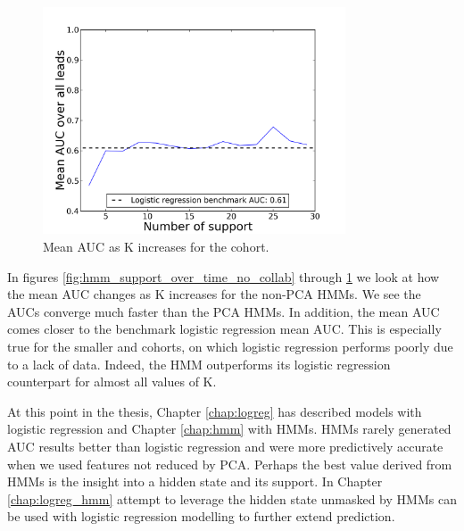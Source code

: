 \begin{figure}[ht!]
  \caption{Mean AUC as K increases for the \wiki cohort.}\label{fig:hmm_support_over_time_wiki_only}
  \centering
    \includegraphics[width=0.8\textwidth]{figures/hmm/wiki_only_support_over_time.png}
\end{figure}

In figures \ref{fig:hmm_support_over_time_no_collab} through \ref{fig:hmm_support_over_time_wiki_only} we look at how the mean AUC changes as K increases for the non-PCA HMMs. We see the AUCs converge much faster than the PCA HMMs. In addition, the mean AUC comes closer to the benchmark logistic regression mean AUC. This is especially true for the smaller \wiki and \both cohorts, on which logistic regression performs poorly due to a lack of data. Indeed, the \wiki HMM outperforms its logistic regression counterpart for almost all values of K.

At this point in the thesis, Chapter \ref{chap:logreg} has described models with logistic regression and Chapter \ref{chap:hmm} with HMMs. HMMs rarely generated AUC results better than logistic regression and were more predictively accurate when we used features not reduced by PCA. Perhaps the best value derived from HMMs is the insight into a hidden state and its support. In Chapter \ref{chap:logreg_hmm} attempt to leverage the hidden state unmasked by HMMs can be used with logistic regression modelling to further extend prediction.
